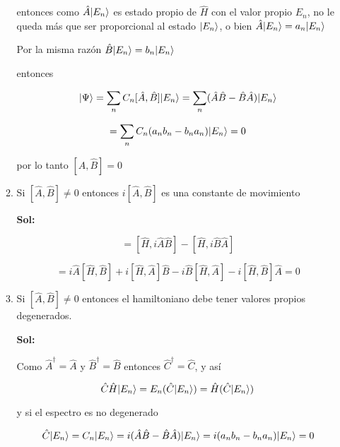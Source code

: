 \documentclass[12pt,a4paper]{article}
\DeclarePairedDelimiter\ket{\lvert}{\rangle}
\begin{document}
\begin{enumerate}
\begin{enumerate}
    entonces como $\hat{A} \ket{E_n}$ es estado propio de $\hat{H}$ con el valor propio $E_n$, no le queda más que ser proporcional al estado $\ket{E_n}$, o bien $\hat{A} \ket{E_n} = a_n \ket{E_n}$
    
    Por la misma razón $\hat{B}\ket{E_n} = b_n \ket{E_n}$
    
    entonces
    
    \begin{equation*}
        [\hat{A}, \hat{B}] \ket{\Psi} = \sum_{n} C_{n} [\hat{A}, \hat{B}] \ket{E_n} = \sum_{n} (\hat{A}\hat{B} - \hat{B}\hat{A}) \ket{E_n}
    \end{equation*}
    
    \begin{equation*}
        = \sum_{n} C_n (a_n b_n - b_n a_n) \ket{E_n} = 0
    \end{equation*}
    
    por lo tanto $[\hat{A},\hat{B}] = 0$
    
    
    \item Si $[\hat{A}, \hat{B}] \neq 0$ entonces $i[\hat{A},\hat{B}]$ es una constante de movimiento
    
    \textbf{Sol:}
    
    \begin{equation*}
        [\hat{H}, \hat{C}] = [\hat{H},i \hat{A}\hat{B}] - [\hat{H}, i \hat{B} \hat{A}]
    \end{equation*}
    
    \begin{equation*}
        = i \hat{A} [\hat{H},\hat{B}] + i [\hat{H},\hat{A}] \hat{B} - i \hat{B} [\hat{H}, \hat{A}] - i [\hat{H}, \hat{B}] \hat{A} = 0
    \end{equation*}
    
    
    \item Si $[\hat{A},\hat{B}] \neq 0$ entonces el hamiltoniano debe tener valores propios degenerados.
    
    
    \textbf{Sol:}
    
    Como $\hat{A}^{\dagger} = \hat{A}$ y $\hat{B}^{\dagger} = \hat{B}$ entonces $\hat{C}^{\dagger} = \hat{C}$, y así
    
    \begin{equation*}
        \hat{C} \hat{H} \ket{E_n}  = E_n (\hat{C}\ket{E_n}) = \hat{H}(\hat{C}\ket{E_n})
    \end{equation*}
    
    y si el espectro es no degenerado
    
    \begin{equation*}
        \hat{C} \ket{E_n} = C_n \ket{E_n} = i(\hat{A}\hat{B} - \hat{B}\hat{A}) \ket{E_n}= i(a_nb_n - b_n a_n) \ket{E_n} = 0
    \end{equation*}
    

\end{enumerate}
\end{enumerate}
\end{document}
